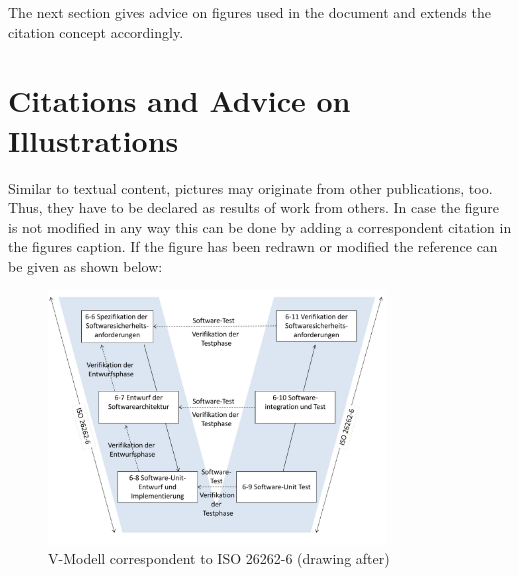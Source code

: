 The next section gives advice on figures used in the document and extends the citation concept accordingly.


\section{Citations and Advice on Illustrations}

Similar to textual content, pictures may originate from other publications, too.
Thus, they have to be declared as results of work from others.
In case the figure is not modified in any way this can be done by adding a correspondent citation in the figures caption.
If the figure has been redrawn or modified the reference can be given as shown below:
\begin{figure}[H]
  \centering
  \includegraphics[width=0.80\textwidth]{figures/V-Modell.pdf}
  \caption{V-Modell correspondent to ISO 26262-6 (drawing after)}
  \label{fig:vmodell}
\end{figure}


